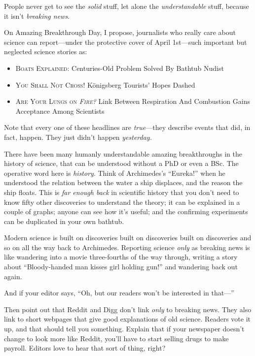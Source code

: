 {
 People never get to see the \textit{solid} stuff, let alone the
\textit{understandable} stuff, because it isn't
\textit{breaking news}.}

{
 On Amazing Breakthrough Day, I propose, journalists who really
care about science can report---under the protective cover of April
1st---such important but neglected science stories as:}

\begin{itemize}
\item \textsc{Boats Explained:} Centuries-Old Problem Solved By Bathtub Nudist
\item \textsc{You Shall Not Cross!} Königsberg Tourists' Hopes
Dashed
\item \textsc{Are Your Lungs on \em{Fire}?} Link Between Respiration And
  Combustion Gains Acceptance Among Scientists
\end{itemize}

{
 Note that every one of these headlines are \textit{true}{}---they
describe events that did, in fact, happen. They just
didn't happen \textit{yesterday.}}

{
 There have been many humanly understandable amazing breakthroughs
in the history of science, that can be understood without a PhD or even
a BSc. The operative word here is \textit{history}. Think of
Archimedes's
``Eureka!'' when he understood the
relation between the water a ship displaces, and the reason the ship
floats. This is \textit{far enough back} in scientific history that you
don't need to know fifty other discoveries to
understand the theory; it can be explained in a couple of graphs;
anyone can see how it's useful; and the confirming
experiments can be duplicated in your own bathtub.}

{
 Modern science is built on discoveries built on discoveries built
on discoveries and so on all the way back to Archimedes. Reporting
science \textit{only} as breaking news is like wandering into a movie
three-fourths of the way through, writing a story about
``Bloody-handed man kisses girl holding
gun!'' and wandering back out again.}

{
 And if your editor says, ``Oh, but our readers
won't be interested in that---''}

{
 Then point out that Reddit and Digg don't link
\textit{only} to breaking news. They also link to short webpages that
give good explanations of old science. Readers vote it up, and that
should tell you something. Explain that if your newspaper
doesn't change to look more like Reddit,
you'll have to start selling drugs to make payroll.
Editors love to hear that sort of thing, right?}

